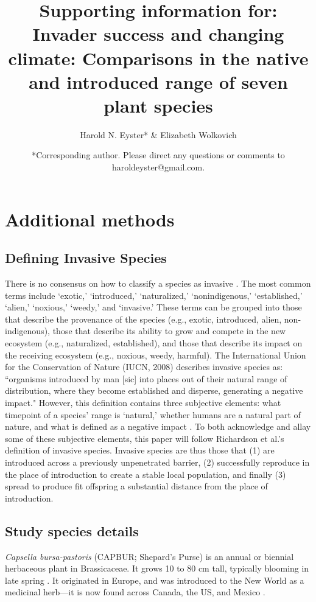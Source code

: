 \documentclass[12pt]{article}\usepackage[]{graphicx}\usepackage[]{color}
\title{\textbf{Supporting information for:}  \\ \bigskip Invader success and changing climate: Comparisons in the native and introduced range of seven plant species}\author{Harold N. Eyster* \&  Elizabeth Wolkovich}
\date{*Corresponding author. Please direct any questions or comments to haroldeyster@gmail.com. }
\begin{document}
\maketitle
\tableofcontents
\section{Additional methods}
\subsection{Defining Invasive Species}
	There is no consensus on how to classify a species as invasive \parencite{Colautti2004}. The most common terms include `exotic,' `introduced,' `naturalized,' `nonindigenous,' `established,' `alien,' `noxious,' `weedy,' and `invasive.' These terms can be grouped into those that describe the provenance of the species (e.g., exotic, introduced, alien, non-indigenous), those that describe its ability to grow and compete in the new ecosystem (e.g., naturalized, established), and those that describe its impact on the receiving ecosystem (e.g., noxious, weedy, harmful). The International Union for the Conservation of Nature (IUCN, 2008) describes invasive species as: ``organisms introduced by man [sic] into places out of their natural range of distribution, where they become established and disperse, generating a negative impact." \nocite{IUCN2008is} However, this definition contains three subjective elements: what timepoint of a species' range is `natural,' whether humans are a natural part of nature, and what is defined as a negative impact \parencite{Munro2019}. To both acknowledge and allay some of these subjective elements, this paper will follow Richardson et al.'s \parencite{Richardson2000,Richardson2011} definition of invasive species. Invasive species are thus those that (1) are introduced across a previously unpenetrated barrier, (2) successfully reproduce in the place of introduction to create a stable local population, and finally (3) spread to produce fit offspring a substantial distance from the place of introduction.

\subsection{Study species details}
\textit{Capsella bursa-pastoris} (CAPBUR; Shepard's Purse) is an annual or biennial herbaceous plant in Brassicaceae. It grows 10 to 80 cm tall, typically blooming in late spring \parencite{Defelice2001}. It originated in Europe, and was introduced to the New World as a medicinal herb---it is now found across Canada, the US, and Mexico \parencite{Westrich1989}.
	
\end{document}
